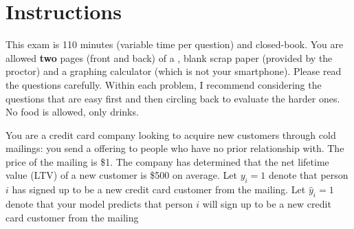 \documentclass[12pt]{article}
\begin{document}
\section*{Instructions}
This exam is 110 minutes (variable time per question) and closed-book. You are allowed \textbf{two} pages (front and back) of a , blank scrap paper (provided by the proctor) and a graphing calculator (which is not your smartphone). Please read the questions carefully. Within each problem, I recommend considering the questions that are easy first and then circling back to evaluate the harder ones. No food is allowed, only drinks. %

\pagebreak

\problem You are a credit card company looking to acquire new customers through cold mailings: you send a  offering to people who have no prior relationship with. The price of the mailing is \$1. The company has determined that the net lifetime value (LTV) of a new customer is \$500 on average. Let $y_i = 1$ denote that person $i$ has signed up to be a new credit card customer from the mailing. Let $\hat{y}_i = 1$ denote that your model predicts that person $i$ will sign up to be a new credit card customer from the mailing
\end{document}
